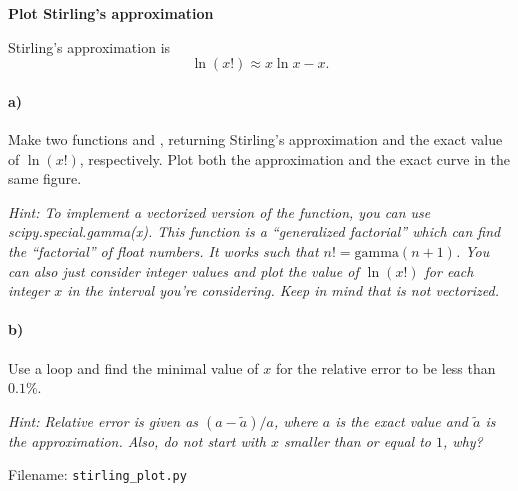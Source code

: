 \begin{Problem}{\textbf{Plot Stirling's approximation}}

\noindent Stirling's approximation is
\begin{equation*}
\ln (x!) \approx x\ln x - x.
\end{equation*}
\paragraph{a)} Make two functions  and ,
returning Stirling's approximation and the exact value of $\ln (x!)$, respectively.
Plot both the approximation and the exact curve in the same figure.

\emph{Hint: To implement a vectorized version of the  function,
you can use scipy.special.gamma(x). This function is a ``generalized factorial''
which can find the ``factorial'' of float numbers. It works such that
$n! = \mathrm{gamma}(n + 1)$. You can also just consider integer values and plot
the value of $\ln (x!)$ for each integer $x$ in the interval you're considering.
Keep in mind that  is not vectorized.}

\paragraph{b)} Use a  loop and find the minimal value of $x$ for
the relative error to be less than $0.1\%$.

\emph{Hint: Relative error is given as $(a - \tilde{a})/a$, where $a$ is the exact
value and $\tilde{a}$ is the approximation. Also, do not start with $x$ smaller
than or equal to $1$, why?}

Filename: \texttt{stirling\_plot.py}
\end{Problem}


